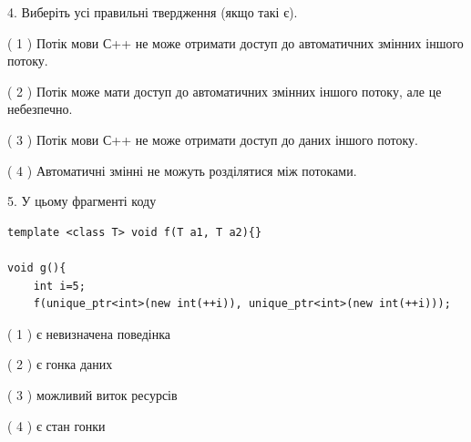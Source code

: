 \documentclass[12pt, ukrainian]{article}
\begin{document}
\begin {large}
{%
4. Виберіть усі правильні твердження (якщо такі є).\par
\vspace{2mm}

( 1 ) Потік мови С++ не може отримати доступ до автоматичних змінних іншого потоку.%

( 2 ) Потік може мати доступ до автоматичних змінних іншого потоку, але це небезпечно.%

( 3 ) Потік мови С++ не може отримати доступ до даних іншого потоку.%

( 4 ) Автоматичні змінні не можуть розділятися між потоками.%


5. У цьому фрагменті коду
\begin{verbatim}
template <class T> void f(T a1, T a2){}

void g(){
    int i=5;
    f(unique_ptr<int>(new int(++i)), unique_ptr<int>(new int(++i)));
\end{verbatim}

( 1 ) є невизначена поведінка%

( 2 ) є гонка даних%

( 3 ) можливий виток ресурсів%

( 4 ) є стан гонки%
}
\end {large}
\end{document}
